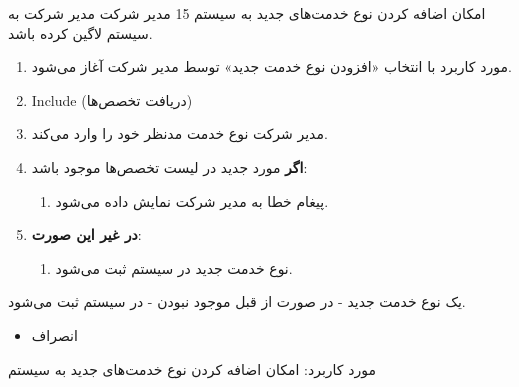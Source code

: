 \usecase
{امکان اضافه کردن نوع خدمت‌های جدید به سیستم}
{15}
{}
{مدیر شرکت}
{}
{مدیر شرکت به سیستم لاگین کرده باشد.}
{
	\vspace*{-0.6cm}
	\begin{enumerate}
		\item 
		مورد کاربرد با انتخاب «افزودن نوع خدمت جدید» توسط مدیر شرکت آغاز می‌شود.
		\item Include (دریافت تخصص‌ها)
		\item مدیر شرکت نوع خدمت مدنظر خود را وارد می‌کند. 
		\item
		\textbf{اگر}
		مورد جدید در لیست تخصص‌ها موجود باشد:
		\begin{enumerate}[label=\theenumi.\arabic*.]
			\item پیغام خطا به مدیر شرکت نمایش داده می‌شود.
		\end{enumerate}
		\item
		\textbf{در غیر این صورت}:
		\begin{enumerate}[label=\theenumi.\arabic*.]
			\item نوع خدمت جدید در سیستم ثبت می‌شود.
		\end{enumerate}		
	\end{enumerate}
}
{یک نوع خدمت جدید - در صورت از قبل موجود نبودن - در سیستم ثبت می‌شود.}
{
	\begin{itemize}
		\vspace*{-0.6cm}
		\item انصراف
	\end{itemize}
}
{
	مورد کاربرد: امکان اضافه کردن نوع خدمت‌های جدید به سیستم
}


